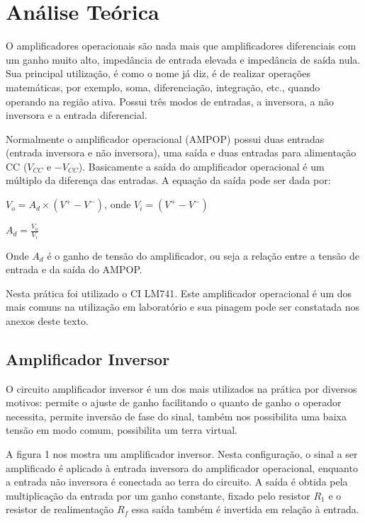 \section{Análise Teórica}

O amplificadores operacionais são nada mais que amplificadores diferenciais com um ganho muito alto, impedância de entrada elevada e impedância de saída nula. Sua principal utilização, é como o nome já diz, é de realizar operações matemáticas, por exemplo, soma, diferenciação, integração, etc., quando operando na região ativa. Possui três modos de entradas, a inversora, a não inversora e a entrada diferencial.

Normalmente o amplificador operacional (AMPOP) possui duas entradas (entrada inversora e não inversora), uma saída e duas entradas para alimentação CC ($V_{CC}$ e $-V_{CC}$). Basicamente a saída do amplificador operacional é um múltiplo da diferença das entradas. A equação da saída pode ser dada por:

\begin{center}
    $V_o = A_d \times (V^+ - V^-)$, onde $V_i=(V^+ - V^-)$
    
    $A_d = \frac{V_o}{V_i}$
\end{center}

Onde $A_d$ é o ganho de tensão do amplificador, ou seja a relação entre a tensão de entrada e da saída do AMPOP.

Nesta prática foi utilizado o CI LM741. Este amplificador operacional é um dos mais comuns na utilização em laboratório e sua pinagem pode ser constatada nos anexos deste texto.

\subsection{Amplificador Inversor}

O circuito amplificador inversor é um dos mais utilizados na prática por diversos motivos: permite o ajuste de ganho facilitando o quanto de ganho o operador necessita, permite inversão de fase do sinal, também nos possibilita uma baixa tensão em modo comum, possibilita um terra virtual. 

A figura 1 nos mostra um amplificador inversor. Nesta configuração, o sinal a ser amplificado é aplicado à entrada inversora do amplificador operacional, enquanto a entrada não inversora é conectada ao terra do circuito. A saída é obtida pela multiplicação da entrada por um ganho constante, fixado pelo resistor $R_1$ e o resistor de realimentação $R_f$ essa saída também é invertida em relação à entrada. 

